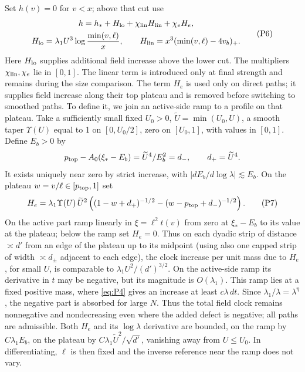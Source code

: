 Set \(h(v)=0\) for \(v<x\); above that cut use
\[
\begin{gathered}
 h=h_*+H_{\rm lo}+\chi_{\rm lin}H_{\rm lin}+\chi_e H_e,\\
 H_{\rm lo}=\lambda_1U^3\log\frac{\min(v,\ell)}x,\qquad
 H_{\rm lin}=x^3(\min(v,\ell)-4v_b)_+.
\end{gathered}                                                        \tag{P6}\label{eq:P6}
\]
Here \(H_{\rm lo}\) supplies additional field increase above the lower
cut. The multipliers \(\chi_{\rm lin},\chi_e\) lie in \([0,1]\).
The linear term is introduced only at final strength and remains during
the size comparison. The term \(H_e\) is used only on direct paths;
it supplies field increase along their top plateau and is removed
before switching to smoothed paths. To define it, we join an active-side
ramp to a profile on that plateau. Take a sufficiently small fixed \(U_0>0\), \(\widetilde U=\min(U_0,U)\), a smooth taper \(\Upsilon(U)\) equal to 1 on \([0,U_0/2]\), zero on \([U_0,1]\), with values in \([0,1]\). Define \(E_b>0\) by
\[
 p_{\rm top}-A_0(\xi_*-E_b)=\widetilde U^4/E_b^2=d_-,\qquad d_+=\widetilde U^4.
\]
It exists uniquely near zero by strict increase, with \(|dE_b/d\log\lambda|\lesssim E_b\). On the plateau \(w=v/\ell\in[p_{\rm top},1]\) set
\[
 H_e=\lambda_1\Upsilon(U)\,\widetilde U^2
       \left((1-w+d_+)^{-1/2}-(w-p_{\rm top}+d_-)^{-1/2}\right).
                                                                        \tag{P7}\label{eq:P7}
\]
On the active part ramp linearly in \(\xi=\ell^2 t(v)\) from zero at \(\xi_*-E_b\) to its value at the plateau; below the ramp set \(H_e=0\). Thus on each dyadic strip of distance \(\asymp d'\) from an edge of the plateau up to its midpoint (using also one capped strip of width \(\asymp d_\pm\) adjacent to each edge), the clock increase per unit mass due to \(H_e\), for small \(U\), is comparable to \(\lambda_1 U^2/(d')^{3/2}\). On the active-side ramp its derivative in \(t\) may be negative,
but its magnitude is \(O(\lambda_1)\). This ramp lies at a fixed
positive mass, where \eqref{eq:P4} gives an increase at least
\(c\lambda\,dt\). Since \(\lambda_1/\lambda=\lambda^\eta\),
the negative part is absorbed for large \(N\). Thus the total field
clock remains nonnegative and nondecreasing even where the added defect
is negative; all paths are admissible. Both \(H_e\) and its \(\log\lambda\) derivative are bounded, on the ramp by \(C\lambda_1 E_b\), on the plateau by \(C\lambda_1\widetilde U^2/\sqrt{d'}\), vanishing away from \(U\le U_0\). In differentiating, \(\ell\) is then fixed and the inverse reference near the ramp does not vary.

